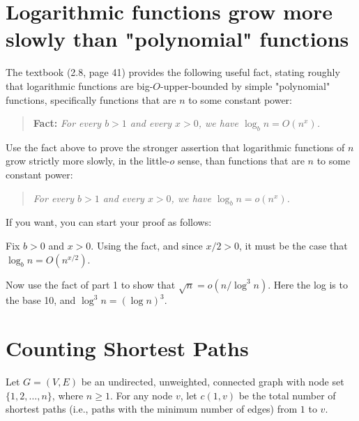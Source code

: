 \documentclass[11pt,fleqn]{exam}
\newenvironment{soln}{\color{solnblue}}{}
\begin{document}

\section{Logarithmic functions grow more slowly than "polynomial" functions}

The textbook (2.8, page 41) provides the following useful fact, stating roughly that logarithmic functions are big-$O$-upper-bounded by
simple "polynomial" functions, specifically functions that are $n$ to some constant power:

\begin{quote}
{\bf Fact:} \emph{For every $b > 1$ and every $x > 0$, we have $\log_b n = O(n^x)$.}
\end{quote}

\begin{questions}
\question[4]
Use the fact above to prove the stronger assertion that logarithmic functions of $n$ grow strictly more slowly, in the little-$o$ sense, than
functions that are $n$ to some constant power:
\begin{quote}
\emph{For every $b > 1$ and every $x > 0$, we have $\log_b n = o(n^x)$.}
\end{quote}

If you want, you can start your proof as follows:

\begin{soln}
Fix $b>0$ and $x>0$. Using the fact, and since $x/2>0$, it must be the case that $\log_b n = O(n^{x/2})$.
\end{soln}

\question[4]
Now use the fact of part 1 to show that $\sqrt{n} = o(n/\log^3 n)$. Here the log is to the base 10, and $\log^3 n = (\log n)^3$.

\end{questions}

\clearpage

\section{Counting Shortest Paths}

Let $G=(V,E)$ be an undirected, unweighted, connected graph with node set $\{1,2,\ldots,n\}$, where $n\ge 1$. For any node $v$, let $c(1,v)$ be the total number of shortest paths (i.e., paths with the minimum number of edges) from $1$ to $v$.
\end{document}
